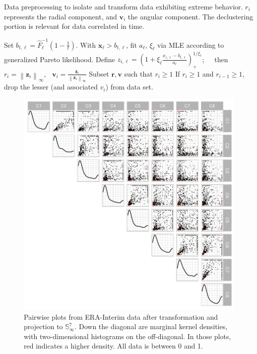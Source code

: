 \documentclass[iicol,sn-basic]{sn-jnl}
\newcommand{\norm}[1]{\left\lVert #1 \right\rVert}
\newcommand{\pnorm}[2]{\norm{#1}_{#2}}
\theoremstyle{thmstyleone}
\begin{document}
\begin{algorithm}[htb]
\caption{Data preprocessing to isolate and transform data exhibiting extreme behavior.  $r_i$ represents the radial component, and $\bm{v}_i$ the angular component.  The declustering portion is relevant for data correlated in time.\label{algo:processing}}
\begin{algorithmic}
\State Set $b_{t,\ell} = \hat{F}_{\ell}^{-1}\left(1 - \frac{1}{t}\right)$.
\State With $\bm{ x}_{\ell} > b_{t,\ell}$, fit $a_{\ell}$, $\xi_{\ell}$ via MLE according to generalized Pareto likelihood.
\EndFor
{}
\State Define $z_{i,\ell} = \left(1 + \xi_{\ell}\frac{x_{i,\ell} - b_{t,\ell}}{a_{\ell}}\right)_{+}^{1/\xi_{\ell}}$; $\;\;\;$ then $r_i = \pnorm{\bm{ z}_i}{\infty}$, $\;\;\bm{ v}_i = \frac{\bm{ z}_i}{\pnorm{\bm{ z}_i}{\infty}}$
\EndFor
\State Subset $\bm{ r},\bm{ v}$ such that $r_i \geq 1$
\State If $r_i \geq 1$ and $r_{i-1} \geq 1$, drop the lesser (and associated $v_i$) from data set.
\EndFor
\EndIf
\end{algorithmic}
\end{algorithm}

\begin{figure}[ht]%
\centering
\caption{Pairwise plots from ERA-Interim data after transformation and projection to ${\mathbb S}_{\infty}^{7}$.  Down the diagonal are marginal kernel densities, with two-dimensional histograms on the off-diagonal.  In those plots, red indicates a higher density.  All data is between 0 and 1.\label{fig:erai_data}}
\includegraphics[width=.7\linewidth]{./images/data_transformed}
\end{figure}
\end{document}

